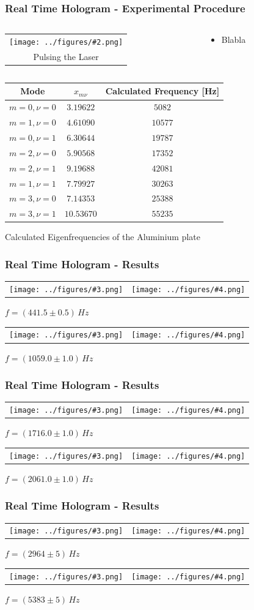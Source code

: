 \documentclass[10pt]{beamer}
\newcommand{\gra}[3][]{
	\begin{table}
	\centering
	\begin{tabular}[width=\textwidth]{c}
		\texttt{[image: ../figures/\#2.png]}\\
		\small #3
	\end{tabular}
	\end{table}
}
\newcommand{\graTwoOneC}[5]{
	\begin{table}
		\centering
		\begin{tabular}[width=\textwidth]{cc}
			\texttt{[image: ../figures/\#3.png]}&
			\texttt{[image: ../figures/\#4.png]}\\
		\end{tabular}
		#5
	\end{table}
}
\begin{document}
\begin{frame}
	\frametitle{Real Time Hologram - Experimental Procedure}
	\begin{columns}
		\begin{column}{0.5\textwidth}
		\gra{oszi-inv}{Pulsing the Laser}%
		\end{column}
		\begin{column}{0.5\textwidth}
			\begin{itemize}
				\item Blabla
			\end{itemize}
		\end{column}
	\end{columns}
\end{frame}



\begin{frame}
	\begin{table}[h]
		\centering
		\begin{tabular}{c|c|c}
			Mode 		& $x_{m\nu}$ & Calculated Frequency [Hz] 	 \\ \hline\hline
			$m=0,\nu=0$	&$3.19622$   &$5082$						\\ \hline
			$m=1,\nu=0$	& $4.61090$  & $10577$					\\ \hline
			$m=0,\nu=1$	& $6.30644$  & $19787$					\\ \hline
			$m=2,\nu=0$	& $5.90568$  & $17352$					\\ \hline
			$m=2,\nu=1$	& $9.19688$  & $42081$					\\ \hline
			$m=1,\nu=1$	& $7.79927$  & $30263$				     \\ \hline
			$m=3,\nu=0$	& $7.14353$  & $25388$                \\ \hline
			$m=3,\nu=1$	& $10.53670$ & $55235$
		\end{tabular} \vskip 0.2cm
		{Calculated Eigenfrequencies of the Aluminium plate}
	\end{table}	
\end{frame}
\begin{frame}
	\frametitle{Real Time Hologram - Results}
	\graTwoOneC{0.4}{0.2}{aluminium2_edit}{aluminium2_lit}{$f=(441.5\pm0.5)\,\si{Hz}$}
	\graTwoOneC{0.4}{0.2}{aluminium3_edit}{aluminium3_lit}{$f=(1059.0\pm1.0)\,\si{Hz}$}
\end{frame}
\begin{frame}
	\frametitle{Real Time Hologram - Results}
	\graTwoOneC{0.4}{0.2}{aluminium6_edit}{aluminium6_lit}{$f=(1716.0\pm1.0)\,\si{Hz}$}
	\graTwoOneC{0.4}{0.2}{aluminium7_edit}{aluminium7_lit}{$f=(2061.0\pm1.0)\,\si{Hz}$}
\end{frame}
\begin{frame}
	\frametitle{Real Time Hologram - Results}
	\graTwoOneC{0.4}{0.2}{aluminium9_edit}{aluminium9_lit}{$f=(2964\pm5)\,\si{Hz}$}
	\graTwoOneC{0.4}{0.2}{aluminium10_edit}{aluminium10_lit}{$f=(5383\pm5)\,\si{Hz}$}
\end{frame}
\end{document}
